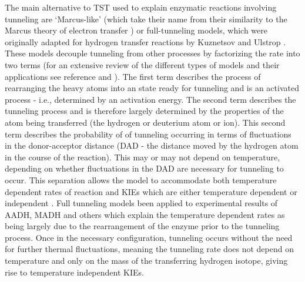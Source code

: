The main alternative to TST used to explain enzymatic reactions involving tunneling are `Marcus-like' (which take their name from their similarity to the Marcus theory of electron transfer \cite{marcusElectronTransfersChemistry1985}) or full-tunneling models, which were originally adapted for hydrogen transfer reactions by Kuznetsov and Ulstrop \cite{kuznetsovProtonHydrogenAtom1999a}. These models decouple tunneling from other processes by factorizing the rate into two terms \cite{kuznetsovProtonHydrogenAtom1999a, antoniouLargeKineticIsotope1997, knappTemperatureDependentIsotopeEffects2002} (for an extensive review of the different types of models and their applications see reference \cite{puMultidimensionalTunnelingRecrossing2006} and \cite[chapters 4, 5 and 6]{allemannQuantumTunnellingEnzymeCatalysed2004}). The first term describes the process of rearranging the heavy atoms into an state ready for tunneling and is an activated process - i.e., determined by an activation energy. The second term describes the tunneling process and is therefore  largely determined by the properties of the atom being transferred (the hydrogen or deuterium atom or ion). This second term describes  the probability of of tunneling occurring  in terms of fluctuations in the donor-acceptor distance (DAD - the distance moved by the hydrogen atom in the course of the reaction). This may or may not depend on temperature, depending on whether fluctuations in the DAD are necessary for tunneling to occur. This separation allows the model to accommodate both temperature dependent rates of reaction and KIEs which are either temperature dependent or independent \cite{klinmanHydrogenTunnelingLinks2013}. Full tunneling models been applied to experimental results of AADH, MADH and others \cite{johannissenProtonTunnelingAromatic2007, johannissenEnzymeAromaticAmine2008, masgrau2004hydrogen, sutcliffeHydrogenTunnellingEnzymecatalysed2006, stojkovic2012effects, klinmanHydrogenTunnelingLinks2013, puMultidimensionalTunnelingRecrossing2006} which explain the temperature dependent rates as being largely due to the rearrangement of the enzyme prior to the tunneling process.  Once in the necessary configuration, tunneling occurs without the need for further thermal fluctuations, meaning the tunneling rate does not depend on temperature and only on the mass of the transferring hydrogen isotope, giving rise to temperature independent KIEs.

